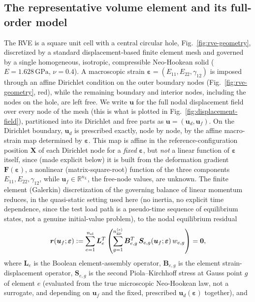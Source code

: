\documentclass[10pt,a4paper]{article}
\begin{document}
\subsection{The representative volume element and its full-order model}
\label{sec:background-fom}
The RVE is a square unit cell with a central circular hole, Fig.~\ref{fig:rve-geometry},
discretized by a standard displacement-based finite element mesh and
governed by a single homogeneous, isotropic, compressible Neo-Hookean solid
($E=1.628\,\mathrm{GPa}$, $\nu=0.4$). A macroscopic strain
$\bm\varepsilon=(E_{11},E_{22},\gamma_{12})$ is imposed through an affine Dirichlet
condition on the outer boundary nodes (Fig.~\ref{fig:rve-geometry}, red),
while the remaining boundary and interior nodes, including the nodes on
the hole, are left free. We write $\bm u$ for the full nodal
displacement field over every node of the mesh (this is what is plotted
in Fig.~\ref{fig:displacement-field}), partitioned into its Dirichlet and
free parts as $\bm u=(\bm u_d,\bm u_f)$. On the Dirichlet boundary,
$\bm u_d$ is prescribed exactly, node by node, by the affine
macro-strain map determined by $\bm\varepsilon$. This map is affine in the
reference-configuration position $\bm X$ of each Dirichlet node for a
\emph{fixed} $\bm\varepsilon$, but \emph{not} a linear function of
$\bm\varepsilon$ itself, since (made explicit below) it is built from
the deformation gradient $\bm F(\bm\varepsilon)$, a nonlinear
(matrix-square-root) function of the three components
$E_{11},E_{22},\gamma_{12}$, while $\bm u_f\in\mathbb R^{n_L}$, the
free-node values, are unknown. The
finite element (Galerkin) discretization of
the governing balance of linear momentum reduces, in the quasi-static
setting used here (no inertia, no explicit time dependence, since the
test load path is a pseudo-time sequence of equilibrium states,
not a genuine initial-value problem), to the nodal equilibrium residual
\begin{equation}
\label{eq:fom-residual}
 \bm r(\bm u_f;\bm\varepsilon) := \sum_{e=1}^{n_{\rm el}}\bm L_e^T\left(\sum_{g=1}^{n_{\rm gp}^{(e)}}\bm B_{e,g}^T\,\bm S_{e,g}(\bm u_f;\bm\varepsilon)\,w_{e,g}\right)=\bm 0,
\end{equation}
where $\bm L_e$ is the Boolean element-assembly operator, $\bm B_{e,g}$ is
the element strain-displacement operator, $\bm S_{e,g}$ is the second
Piola--Kirchhoff stress at Gauss point $g$ of element $e$ (evaluated from
the true microscopic Neo-Hookean law, not a surrogate, and depending on
$\bm u_f$ and the fixed, prescribed $\bm u_d(\bm\varepsilon)$ together), and
\end{document}
